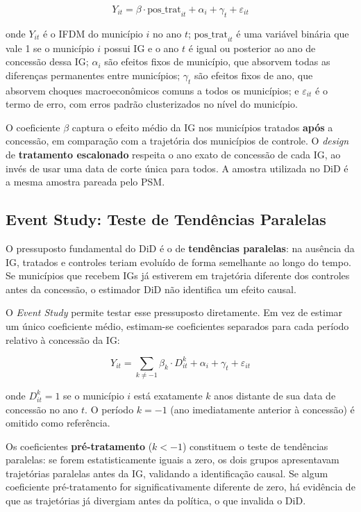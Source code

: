 \documentclass[12pt, a4paper]{article}
\begin{document}
\begin{equation}
Y_{it} = \beta \cdot \text{pos\_trat}_{it} + \alpha_i + \gamma_t + \varepsilon_{it}
\label{eq:did}
\end{equation}

\noindent onde $Y_{it}$ é o IFDM do município $i$ no ano $t$; $\text{pos\_trat}_{it}$ é uma variável binária que vale 1 se o município $i$ possui IG e o ano $t$ é igual ou posterior ao ano de concessão dessa IG; $\alpha_i$ são efeitos fixos de município, que absorvem todas as diferenças permanentes entre municípios; $\gamma_t$ são efeitos fixos de ano, que absorvem choques macroeconômicos comuns a todos os municípios; e $\varepsilon_{it}$ é o termo de erro, com erros padrão clusterizados no nível do município.

O coeficiente $\beta$ captura o efeito médio da IG nos municípios tratados \textbf{após} a concessão, em comparação com a trajetória dos municípios de controle. O \textit{design} de \textbf{tratamento escalonado} respeita o ano exato de concessão de cada IG, ao invés de usar uma data de corte única para todos. A amostra utilizada no DiD é a mesma amostra pareada pelo PSM.

\subsection{Event Study: Teste de Tendências Paralelas}

O pressuposto fundamental do DiD é o de \textbf{tendências paralelas}: na ausência da IG, tratados e controles teriam evoluído de forma semelhante ao longo do tempo. Se municípios que recebem IGs já estiverem em trajetória diferente dos controles antes da concessão, o estimador DiD não identifica um efeito causal.

O \textit{Event Study} permite testar esse pressuposto diretamente. Em vez de estimar um único coeficiente médio, estimam-se coeficientes separados para cada período relativo à concessão da IG:

\begin{equation}
Y_{it} = \sum_{k \neq -1} \beta_k \cdot D_{it}^k + \alpha_i + \gamma_t + \varepsilon_{it}
\label{eq:eventstudy}
\end{equation}

\noindent onde $D_{it}^k = 1$ se o município $i$ está exatamente $k$ anos distante de sua data de concessão no ano $t$. O período $k = -1$ (ano imediatamente anterior à concessão) é omitido como referência.

Os coeficientes \textbf{pré-tratamento} ($k < -1$) constituem o teste de tendências paralelas: se forem estatisticamente iguais a zero, os dois grupos apresentavam trajetórias paralelas antes da IG, validando a identificação causal. Se algum coeficiente pré-tratamento for significativamente diferente de zero, há evidência de que as trajetórias já divergiam antes da política, o que invalida o DiD.
\end{document}
